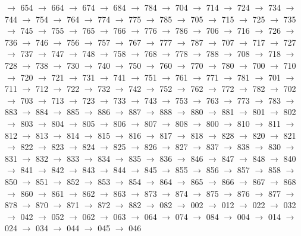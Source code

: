 $\rightarrow$ 654 $\rightarrow$ 664 $\rightarrow$ 674 $\rightarrow$ 684 $\rightarrow$ 784 $\rightarrow$ 704 $\rightarrow$ 714 $\rightarrow$ 724 $\rightarrow$ 734 $\rightarrow$ 744 $\rightarrow$ 754 $\rightarrow$ 764 $\rightarrow$ 774 $\rightarrow$ 775 $\rightarrow$ 785 $\rightarrow$ 705 $\rightarrow$ 715 $\rightarrow$ 725 $\rightarrow$ 735 $\rightarrow$ 745 $\rightarrow$ 755 $\rightarrow$ 765 $\rightarrow$ 766 $\rightarrow$ 776 $\rightarrow$ 786 $\rightarrow$ 706 $\rightarrow$ 716 $\rightarrow$ 726 $\rightarrow$ 736 $\rightarrow$ 746 $\rightarrow$ 756 $\rightarrow$ 757 $\rightarrow$ 767 $\rightarrow$ 777 $\rightarrow$ 787 $\rightarrow$ 707 $\rightarrow$ 717 $\rightarrow$ 727 $\rightarrow$ 737 $\rightarrow$ 747 $\rightarrow$ 748 $\rightarrow$ 758 $\rightarrow$ 768 $\rightarrow$ 778 $\rightarrow$ 788 $\rightarrow$ 708 $\rightarrow$ 718 $\rightarrow$ 728 $\rightarrow$ 738 $\rightarrow$ 730 $\rightarrow$ 740 $\rightarrow$ 750 $\rightarrow$ 760 $\rightarrow$ 770 $\rightarrow$ 780 $\rightarrow$ 700 $\rightarrow$ 710 $\rightarrow$ 720 $\rightarrow$ 721 $\rightarrow$ 731 $\rightarrow$ 741 $\rightarrow$ 751 $\rightarrow$ 761 $\rightarrow$ 771 $\rightarrow$ 781 $\rightarrow$ 701 $\rightarrow$ 711 $\rightarrow$ 712 $\rightarrow$ 722 $\rightarrow$ 732 $\rightarrow$ 742 $\rightarrow$ 752 $\rightarrow$ 762 $\rightarrow$ 772 $\rightarrow$ 782 $\rightarrow$ 702 $\rightarrow$ 703 $\rightarrow$ 713 $\rightarrow$ 723 $\rightarrow$ 733 $\rightarrow$ 743 $\rightarrow$ 753 $\rightarrow$ 763 $\rightarrow$ 773 $\rightarrow$ 783 $\rightarrow$ 883 $\rightarrow$ 884 $\rightarrow$ 885 $\rightarrow$ 886 $\rightarrow$ 887 $\rightarrow$ 888 $\rightarrow$ 880 $\rightarrow$ 881 $\rightarrow$ 801 $\rightarrow$ 802 $\rightarrow$ 803 $\rightarrow$ 804 $\rightarrow$ 805 $\rightarrow$ 806 $\rightarrow$ 807 $\rightarrow$ 808 $\rightarrow$ 800 $\rightarrow$ 810 $\rightarrow$ 811 $\rightarrow$ 812 $\rightarrow$ 813 $\rightarrow$ 814 $\rightarrow$ 815 $\rightarrow$ 816 $\rightarrow$ 817 $\rightarrow$ 818 $\rightarrow$ 828 $\rightarrow$ 820 $\rightarrow$ 821 $\rightarrow$ 822 $\rightarrow$ 823 $\rightarrow$ 824 $\rightarrow$ 825 $\rightarrow$ 826 $\rightarrow$ 827 $\rightarrow$ 837 $\rightarrow$ 838 $\rightarrow$ 830 $\rightarrow$ 831 $\rightarrow$ 832 $\rightarrow$ 833 $\rightarrow$ 834 $\rightarrow$ 835 $\rightarrow$ 836 $\rightarrow$ 846 $\rightarrow$ 847 $\rightarrow$ 848 $\rightarrow$ 840 $\rightarrow$ 841 $\rightarrow$ 842 $\rightarrow$ 843 $\rightarrow$ 844 $\rightarrow$ 845 $\rightarrow$ 855 $\rightarrow$ 856 $\rightarrow$ 857 $\rightarrow$ 858 $\rightarrow$ 850 $\rightarrow$ 851 $\rightarrow$ 852 $\rightarrow$ 853 $\rightarrow$ 854 $\rightarrow$ 864 $\rightarrow$ 865 $\rightarrow$ 866 $\rightarrow$ 867 $\rightarrow$ 868 $\rightarrow$ 860 $\rightarrow$ 861 $\rightarrow$ 862 $\rightarrow$ 863 $\rightarrow$ 873 $\rightarrow$ 874 $\rightarrow$ 875 $\rightarrow$ 876 $\rightarrow$ 877 $\rightarrow$ 878 $\rightarrow$ 870 $\rightarrow$ 871 $\rightarrow$ 872 $\rightarrow$ 882 $\rightarrow$ 082 $\rightarrow$ 002 $\rightarrow$ 012 $\rightarrow$ 022 $\rightarrow$ 032 $\rightarrow$ 042 $\rightarrow$ 052 $\rightarrow$ 062 $\rightarrow$ 063 $\rightarrow$ 064 $\rightarrow$ 074 $\rightarrow$ 084 $\rightarrow$ 004 $\rightarrow$ 014 $\rightarrow$ 024 $\rightarrow$ 034 $\rightarrow$ 044 $\rightarrow$ 045 $\rightarrow$ 046 